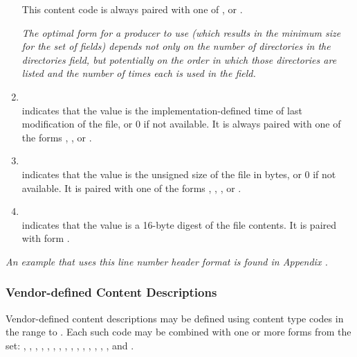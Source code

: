 \begin{enumerate}[1. ]
This content code is always paired with one of \DWFORMdataone, 
\DWFORMdatatwo{} or \DWFORMudata.

\textit{The optimal form for a producer to use (which results in the
minimum size for the set of  fields) depends not only
on the number of directories in the directories
field, but potentially on the order in which those directories are
listed and the number of times each is used in the  field.}

\item \DWLNCTtimestampTARG \\
\DWLNCTtimestampNAME{} indicates that the value is the implementation-defined 
time of last modification of the file, or 0 if not available. 
It is always paired with one of the forms
\DWFORMudata, \DWFORMdatafour, \DWFORMdataeight{} or \DWFORMblock.
   
\item  \DWLNCTsizeTARG \\
\DWLNCTsizeNAME{} indicates that the value is the unsigned size of the
file in bytes, or 0 if not available. It is paired with one of the
forms \DWFORMudata, \DWFORMdataone, \DWFORMdatatwo, \DWFORMdatafour{}
or \DWFORMdataeight.
 
\item \DWLNCTMDfiveTARG \\
\DWLNCTMDfiveNAME{} indicates that the value is a 16-byte \MDfive{} digest
of the file contents. It is paired with form \DWFORMdatasixteen.
\end{enumerate}

\textit{An example that uses this line number header format
is found in Appendix .}

\subsubsection{Vendor-defined Content Descriptions}
\label{chap:vendordefinedcontentdescriptions}
Vendor-defined content descriptions may be defined using content
type codes in the range \DWLNCTlouserNAME{} to \DWLNCThiuserNAME{}. Each
such code may be combined with one or more forms from the set:
\DWFORMblock, \DWFORMblockone, \DWFORMblocktwo, \DWFORMblockfour,
\DWFORMdataone, \DWFORMdatatwo, \DWFORMdatafour, \DWFORMdataeight,
\DWFORMdatasixteen,
\DWFORMflag, \DWFORMlinestrp, \DWFORMsdata, \DWFORMsecoffset,
\DWFORMstring, \DWFORMstrp, \DWFORMstrxXN{} and \DWFORMudata.

